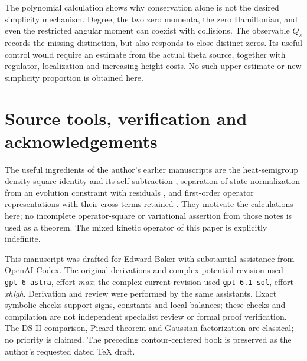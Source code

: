 \documentclass[11pt]{article}
\theoremstyle{definition}
\theoremstyle{remark}
\begin{document}
The polynomial calculation shows why conservation alone is not the
desired simplicity mechanism. Degree, the two zero momenta, the zero
Hamiltonian, and even the restricted angular moment can coexist with
collisions. The observable $Q_s$ records the missing distinction, but
also responds to close distinct zeros. Its useful control would require
an estimate from the actual theta source, together with regulator,
localization and increasing-height costs. No such upper estimate or
new simplicity proportion is obtained here.

\section*{Source tools, verification and acknowledgements}

The useful ingredients of the author's earlier manuscripts are the
heat-semigroup density-square identity and its self-subtraction
\cite{BakerSigma}, separation of state normalization from an evolution
constraint with residuals \cite{BakerHeat}, and first-order operator
representations with their cross terms retained \cite{BakerDirac}.
They motivate the calculations here; no incomplete operator-square or
variational assertion from those notes is used as a theorem. The
mixed kinetic operator of this paper is explicitly indefinite.

This manuscript was drafted for Edward Baker with substantial assistance
from OpenAI Codex. The original derivations and complex-potential
revision used \texttt{gpt-6-astra}, effort \emph{max}; the complex-current
revision used \texttt{gpt-6.1-sol}, effort \emph{xhigh}. Derivation and
review were performed by the same assistants. Exact symbolic checks
support signs, constants and local balances; these checks and
compilation are not independent specialist review or formal proof
verification. The DS-II comparison, Picard theorem and Gaussian
factorization are classical; no priority is claimed. The preceding
contour-centered book is preserved as the author's requested dated
TeX draft.
\end{document}
